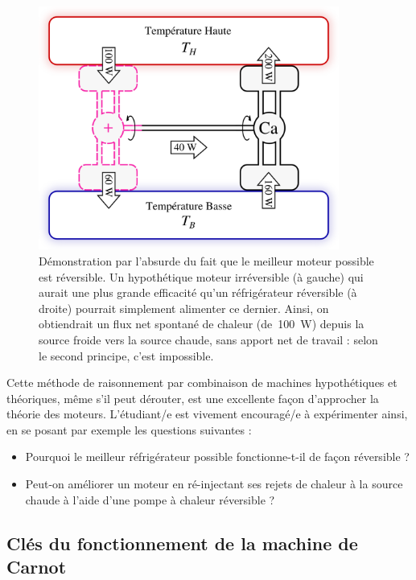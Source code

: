 		\begin{figure}
			\begin{center}
				\includegraphics[height=8cm]{images/carnot_moteur_plusplus.png}
			\end{center}
			\caption{Démonstration par l’absurde du fait que le meilleur moteur possible est réversible.
		Un hypothétique moteur irréversible (à gauche) qui aurait une plus grande efficacité qu’un réfrigérateur réversible (à droite) pourrait simplement alimenter ce dernier. Ainsi, on obtiendrait un flux net spontané de chaleur (de~\SI{100}{W}) depuis la source froide vers la source chaude, sans apport net de travail : selon le second principe, c’est impossible.}
			\label{fig_plus_que_machine_de_carnot}
		\end{figure}

		Cette méthode de raisonnement par combinaison de machines hypothétiques et théoriques, même s’il peut dérouter, est une excellente façon d’approcher la théorie des moteurs. L’étudiant/e est vivement encouragé/e à expérimenter ainsi, en se posant par exemple les questions suivantes :

		\begin{itemize}
			\item Pourquoi le meilleur réfrigérateur possible fonctionne-t-il de façon réversible ?
			\item Peut-on améliorer un moteur en ré-injectant ses rejets de chaleur à la source chaude à l’aide d’une pompe à chaleur réversible ?
		\end{itemize}



	\subsection{Clés du fonctionnement de la machine de Carnot}

